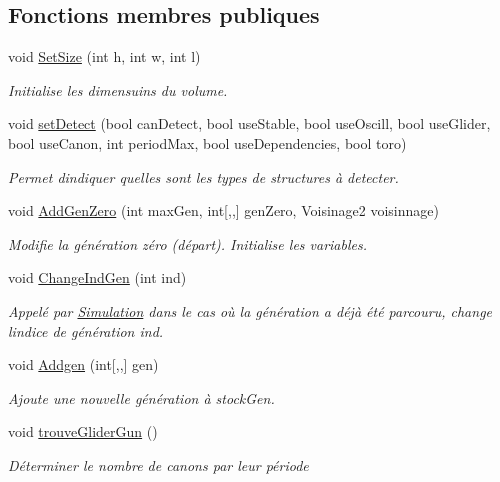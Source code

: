 \subsection*{Fonctions membres publiques}
\begin{DoxyCompactItemize}
\item 
void \mbox{\hyperlink{class_detection_a43ce2bcef47db14aa4a5a2ff39fee974}{Set\+Size}} (int h, int w, int l)
\begin{DoxyCompactList}\small\item\em Initialise les dimensuins du volume. \end{DoxyCompactList}\item 
void \mbox{\hyperlink{class_detection_a31fe39fdfc2f5b8c9e92bcfe1c5d6cc0}{set\+Detect}} (bool can\+Detect, bool use\+Stable, bool use\+Oscill, bool use\+Glider, bool use\+Canon, int period\+Max, bool use\+Dependencies, bool toro)
\begin{DoxyCompactList}\small\item\em Permet d\textquotesingle{}indiquer quelles sont les types de structures à detecter. \end{DoxyCompactList}\item 
void \mbox{\hyperlink{class_detection_a96c6d9a8e299f137a4fb84d2ea80e092}{Add\+Gen\+Zero}} (int max\+Gen, int\mbox{[},,\mbox{]} gen\+Zero, Voisinage2 voisinnage)
\begin{DoxyCompactList}\small\item\em Modifie la génération zéro (départ). Initialise les variables. \end{DoxyCompactList}\item 
void \mbox{\hyperlink{class_detection_a70084049883e8e2ebecce5d24e84a196}{Change\+Ind\+Gen}} (int ind)
\begin{DoxyCompactList}\small\item\em Appelé par \mbox{\hyperlink{class_simulation}{Simulation}} dans le cas où la génération a déjà été parcouru, change l\textquotesingle{}indice de génération ind. \end{DoxyCompactList}\item 
void \mbox{\hyperlink{class_detection_a92c60be1a69ea74b7f7bef04a0e53238}{Addgen}} (int\mbox{[},,\mbox{]} gen)
\begin{DoxyCompactList}\small\item\em Ajoute une nouvelle génération à stock\+Gen. \end{DoxyCompactList}\item 
void \mbox{\hyperlink{class_detection_aa21c434f39d4e9d901635d9db2a4bbca}{trouve\+Glider\+Gun}} ()
\begin{DoxyCompactList}\small\item\em Déterminer le nombre de canons par leur période \end{DoxyCompactList}\end{DoxyCompactItemize}


